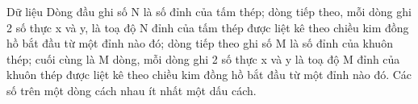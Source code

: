 Dữ liệu  
Dòng đầu ghi số N là số đỉnh của tấm thép; dòng tiếp theo, mỗi dòng ghi 2 số thực x và y, là toạ độ N đỉnh của tấm thép được liệt kê theo chiều   kim đồng hồ bắt đầu từ một đỉnh nào đó; dòng tiếp theo ghi số M là số đỉnh của khuôn thép; cuối cùng là M dòng, mỗi dòng ghi 2 số thực x và y là toạ   độ M đỉnh của khuôn thép được liệt kê theo chiều kim đồng hồ bắt đầu từ một đỉnh nào đó. Các số trên một dòng cách nhau ít nhất một dấu cách.